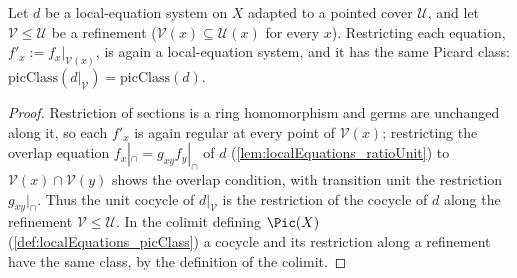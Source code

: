 \begin{lemma}
  \label{lem:localEquations_restrict}
  \leanok
  Let \(d\) be a local-equation system on \(X\) adapted to a pointed cover \(\mathcal U\),
  and let \(\mathcal V \le \mathcal U\) be a refinement (\(\mathcal V(x) \subseteq
  \mathcal U(x)\) for every \(x\)). Restricting each equation, \(f'_x := f_x|_{\mathcal
  V(x)}\), is again a local-equation system, and it has the same Picard class:
  \(\mathrm{picClass}(d|_{\mathcal V}) = \mathrm{picClass}(d)\).
\end{lemma}
\begin{proof}
  \leanok
  Restriction of sections is a ring homomorphism and germs are unchanged along it, so each
  \(f'_x\) is again regular at every point of \(\mathcal V(x)\); restricting the overlap
  equation \(f_x|_\cap = g_{xy} f_y|_\cap\) of \(d\) (\ref{lem:localEquations_ratioUnit})
  to \(\mathcal V(x) \cap \mathcal V(y)\) shows the overlap condition, with transition unit
  the restriction \(g_{xy}|_\cap\). Thus the unit cocycle of \(d|_{\mathcal V}\) is the
  restriction of the cocycle of \(d\) along the refinement \(\mathcal V \le \mathcal U\).
  In the colimit defining \(\Pic(X)\) (\ref{def:localEquations_picClass}) a cocycle and its
  restriction along a refinement have the same class, by the definition of the colimit.
\end{proof}

